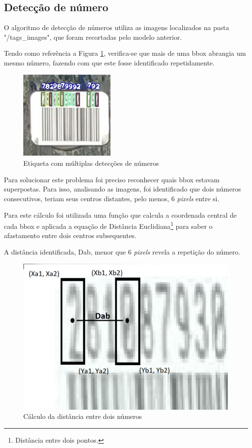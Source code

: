 \subsection{Detecção de número}


O algoritmo de detecção de números utiliza as imagens localizados na pasta "/tags\_images", que foram recortadas pelo modelo anterior.

Tendo como referência a Figura \ref{fig:numDup}, verifica-se que mais de uma bbox abrangia um mesmo número, fazendo com que este fosse identificado repetidamente. 

\begin{figure}[H]
	\centering
	\includegraphics[width=0.4\linewidth]{figuras/MachineLearning/numDup.png}
	\caption{Etiqueta com múltiplas detecções de números}
	\label{fig:numDup}
\end{figure}

Para solucionar este problema foi preciso reconhecer quais bbox estavam superpostas. Para isso, analisando as imagens, foi identificado que dois números consecutivos, teriam seus centros distantes, pelo menos, 6 \textit{pixels} entre si. 

Para este cálculo foi utilizada  uma função que calcula a coordenada central de cada bbox e aplicada a equação de Distância Euclidiana\footnote{Distância entre dois pontos.} para saber o afastamento entre dois centros subsequentes.

A distância identificada, Dab, menor que 6 \textit{pixels} revela a repetição do número.

\begin{figure}[H]
	\centering
	\includegraphics[width=0.6\linewidth]{figuras/MachineLearning/dab.png}
	\caption{Cálculo da distância entre dois números}
	\label{fig:dab}
\end{figure}

